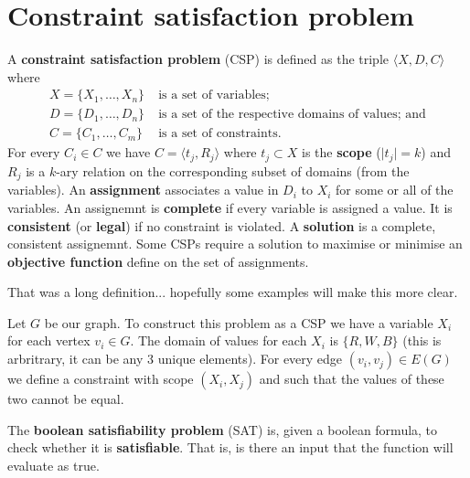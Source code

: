 \chapter{Constraint satisfaction problem}

\begin{definition}
    A \textbf{constraint satisfaction problem} (CSP) is defined as the triple $\langle X, D, C \rangle$ where
    \begin{align*}
        X = \{ X_1, \ldots, X_n \} &\;\text{is a set of variables;} \\
        D = \{ D_1, \ldots, D_n \} &\;\text{is a set of the respective domains of values; and} \\
        C = \{ C_1, \ldots, C_m \} &\;\text{is a set of constraints.}
    \end{align*}
    For every $C_i \in C$ we have $C = \langle t_j, R_j \rangle$ where $t_j \subset X$ is the \textbf{scope} ($\lvert t_j \rvert = k$) and $R_j$ is a $k$-ary relation on the corresponding subset of domains (from the variables). 
    An \textbf{assignment} associates a value in $D_i$ to $X_i$ for some or all of the variables. 
    An assignemnt is \textbf{complete} if every variable is assigned a value. 
    It is \textbf{consistent} (or \textbf{legal}) if no constraint is violated. 
    A \textbf{solution} is a complete, consistent assignemnt. 
    Some CSPs require a solution to maximise or minimise an \textbf{objective function} define on the set of assignments.
\end{definition}

That was a long definition... hopefully some examples will make this more clear.

\begin{example}
    Let $G$ be our graph.
    To construct this problem as a CSP we have a variable $X_i$ for each vertex $v_i \in G$. 
    The domain of values for each $X_i$ is $\{R, W, B\}$ (this is arbritrary, it can be any 3 unique elements). 
    For every edge $(v_i, v_j) \in E(G)$ we define a constraint with scope $(X_i, X_j)$ and such that the values of these two cannot be equal.
\end{example}

\begin{problem}
    The \textbf{boolean satisfiability problem} (SAT) is, given a boolean formula, to check whether it is \textbf{satisfiable}. That is, is there an input that the function will evaluate as true.
\end{problem}

